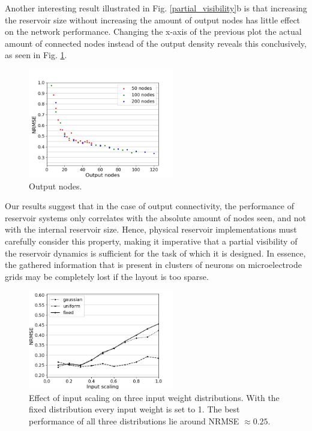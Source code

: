 Another interesting result illustrated in Fig. \ref{partial_visibility}b is that
increasing the reservoir size without increasing the amount of output nodes has
little effect on the network performance. Changing the x-axis of the previous
plot the actual amount of connected nodes instead of the output density reveals
this conclusively, as seen in Fig. \ref{output_nodes}.

\begin{figure}[H]
  \centering
  \includegraphics[width=2.5in]{img/output_nodes.png}
  \caption{
    Output nodes.
  }
  \label{output_nodes}
\end{figure}

Our results suggest that in the case of output connectivity, the performance of
reservoir systems only correlates with the absolute amount of nodes seen, and
not with the internal reservoir size. Hence, physical reservoir implementations
must carefully consider this property, making it imperative that a partial
visibility of the reservoir dynamics is sufficient for the task of which it is
designed. In essence, the gathered information that is present in clusters of
neurons on microelectrode grids may be completely lost if the layout is too
sparse.




\begin{figure}[H]
  \centering
  \includegraphics[width=2.5in]{img/input_scaling_distrib.png}
  \caption{
    Effect of input scaling on three input weight distributions. With the fixed
distribution every input weight is set to 1. The best performance of all three
distributions lie around NRMSE $\approx 0.25$.
  }
  \label{input_scaling_distrib}
\end{figure}

